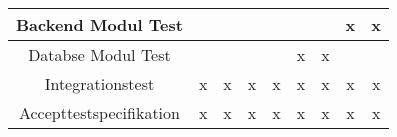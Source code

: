 \begin{center}
\begin{longtable}{|c|c|c|c|c|c|c|c|c|}
    Backend Modul Test          &        &       &       &        &        &       & x     & x      \\ \hline
    Databse Modul Test          &        &       &       &        & x      & x     &       &        \\ \hline
    Integrationstest            & x      & x     & x     & x      & x      & x     & x     & x      \\ \hline
    Accepttestspecifikation     & x      & x     & x     & x      & x      & x     & x     & x      \\ \hline
  \end{longtable}
  \addtocounter{table}{-1}
\end{center}

\newpage
